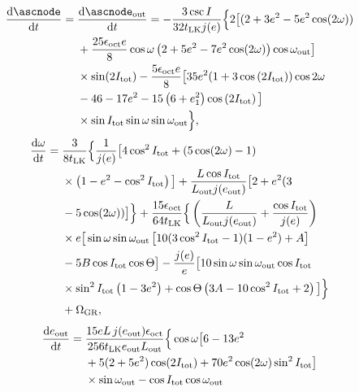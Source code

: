 \documentclass[10pt,
        twocolumn,
        fleqn,
    ]{revtex4-2}%
\newcommand*{\rd}[2]{\frac{\mathrm{d}#1}{\mathrm{d}#2}}
\newcommand*{\p}[1]{\left(#1\right)}
\newcommand*{\s}[1]{\left[#1\right]}
\begin{document}
{\begin{align}
    \rd{\ascnode}{t} ={}& \rd{\ascnode_{\rm out}}{t}
            = -\frac{3\csc I}{32 t_{\rm LK}j(e)}\Big\{
            2\big[(2 + 3e^2 - 5e^2 \cos (2\omega))\nonumber\\
        &+ \frac{25 \epsilon_{\rm oct}e}{8} \cos \omega
            \p{2 + 5e^2 - 7e^2\cos(2\omega)}\cos \omega_{\rm out}\big]\nonumber\\
        &\times\sin (2I_{\rm tot}) - \frac{5\epsilon_{\rm oct}e}{8}
            \big[35e^2(1 + 3\cos\p{2I_{\rm tot}})\cos 2\omega\nonumber\\
        &- 46 - 17e^2 - 15\p{6 + e_1^2}\cos\p{2I_{\rm tot}}\big]\nonumber\\
        &\times \sin I_{\rm tot} \sin \omega \sin \omega_{\rm out}\Big\},
\end{align}
\begin{align}
    \rd{\omega}{t} ={}& \frac{3}{8t_{\rm LK}}
            \Big\{\frac{1}{j(e)} \big[4 \cos^2 I_{\rm tot}
            + \p{5 \cos (2\omega) - 1}\nonumber\\
        &\times \p{1 - e^2 - \cos^2 I_{\rm tot}}\big] + \frac{L \cos I_{\rm tot}}{
            L_{\rm out}j(e_{\rm out})}\big[2 + e^2(3\nonumber\\
        &- 5\cos(2\omega))\big]\Big\}
        + \frac{15 \epsilon_{\rm oct}}{64t_{\rm LK}}\Big\{
            \p{\frac{L}{L_{\rm out}j(e_{\rm out})}
                + \frac{\cos I_{\rm tot}}{j(e)}}\nonumber\\
        &\times e\big[\sin \omega \sin \omega_{\rm out}
            \s{10(3\cos^2 I_{\rm tot} - 1)(1 - e^2) + A}\nonumber\\
        &- 5B\cos I_{\rm tot}\cos \Theta\big] - \frac{j(e)}{e}
            \big[10 \sin \omega \sin \omega_{\rm out}\cos I_{\rm tot}\nonumber\\
        &\times \sin^2 I_{\rm tot}\p{1 - 3e^2} + \cos \Theta\p{3A -
            10\cos^2 I_{\rm tot} + 2}\big]\Big\}\nonumber\\
        &+ \Omega_{\rm GR},
\end{align}
\begin{align}
    \rd{e_{\rm out}}{t} ={}& \frac{15eL\,j(e_{\rm out})\epsilon_{\rm oct}}{
            256t_{\rm LK}e_{\rm out}L_{\rm out}}\Big\{ \cos \omega
                \big[6 - 13e^2\nonumber\\
        &+ 5(2 + 5e^2)\cos (2I_{\rm tot}) + 70e^2 \cos (2\omega) \sin^2 I_{\rm
            tot}\big]\nonumber\\
        &\times \sin \omega_{\rm out} - \cos I_{\rm tot} \cos \omega_{\rm out}

\end{align}}
\end{document}

